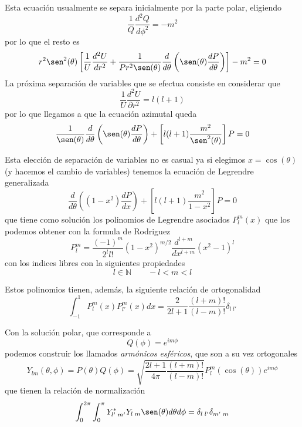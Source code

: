 \documentclass[a4paper]{article}
\numberwithin{equation}{section} %
\begin{document}
Esta ecuación usualmente se separa inicialmente por la parte polar, eligiendo
\begin{equation}
 \frac{1}{Q} \frac{d^2 Q}{d \phi^2} = -m^2
\end{equation}
por lo que el resto es
\[ r^2 \sen^2(\theta) \left[ \frac{1}{U} \frac{d^2 U}{d r^2} + \frac{1}{P r^2 \sen(\theta)} \frac{d}{d\theta} \left( \sen(\theta) \frac{d P}{d\theta}\right)\right] - m^2 = 0 \]
La próxima separación de variables que se efectua consiste en considerar que
\begin{equation}
\frac{1}{U} \frac{d^2 U}{\partial r^2} = l (l + 1) 
\end{equation}
por lo que llegamos a que la ecuación azimutal queda
\begin{equation}
\frac{1}{\sen(\theta)} \frac{d}{d\theta} \left( \sen(\theta) \frac{d P}{d\theta}\right) + \left[l (l + 1) \frac{m^2}{\sen^2(\theta)}\right] P = 0
\end{equation}

Esta elección de separación de variables no es casual ya si elegimos $x = \cos(\theta)$ (y hacemos el cambio de variables) tenemos la ecuación de Legrendre generalizada
\begin{equation}
\frac{d}{d\theta} \left( (1 - x^2) \frac{d P}{d x}\right) + \left[l (l + 1) \frac{m^2}{1 - x^2}\right] P = 0
\end{equation}
que tiene como solución los polinomios de Legrendre asociados $P^{m}_l(x)$ que los podemos obtener con la formula de Rodriguez
\begin{equation}
P^{m}_l = \frac{(-1)^m}{2^l l!} (1 - x^2)^{m/2} \frac{d^{l + m}}{d x^{l + m}} (x^2 - 1)^l
\end{equation}
con los indices libres con la siguientes propiedades
\begin{equation}
l \in \mathbb{N} \qquad -l < m < l 
\end{equation}

Estos polinomios tienen, además, la siguiente relación de ortogonalidad
\begin{equation}
\int_{-1}^{1} P^m_{l}(x) P^m_{l'}(x) dx = \frac{2}{2l + 1} \frac{(l + m)!}{(l - m)!} \delta_{l \; l'}
\end{equation}



Con la solución polar, que corresponde a 
\begin{equation}
Q(\phi) = e^{i m \phi}
\end{equation}
podemos construir los llamados \emph{armónicos esféricos}, que son a su vez ortogonales
\begin{equation}
Y_{lm}(\theta,\phi) = P(\theta) Q(\phi) = \sqrt{\frac{2l + 1}{4\pi} \frac{(l + m)!}{(l - m)!}} P^{m}_l(\cos(\theta)) e^{i m \phi}
\end{equation}
que tienen la relación de normalización
\begin{equation}
\int_{0}^{2\pi} \int_{0}^{\pi} Y^{*}_{l' \; m'} Y_{l \; m} \sen(\theta) d\theta d\phi = \delta_{l\;l'} \delta_{m'\; m}
\end{equation}
\end{document}
